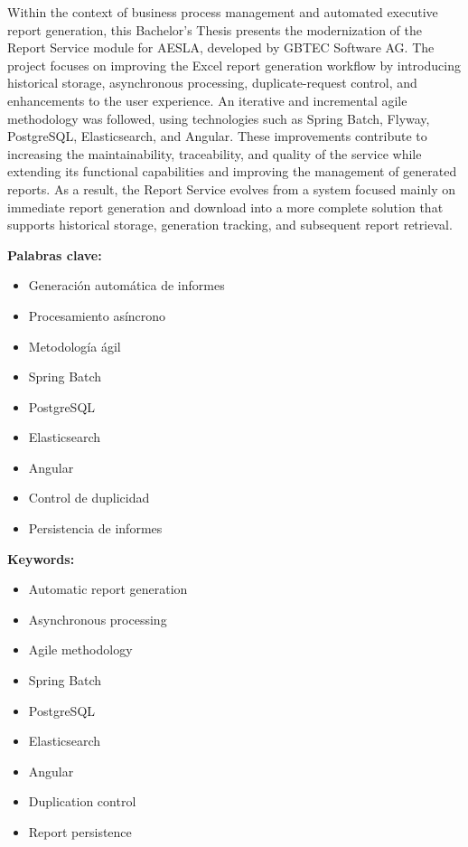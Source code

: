 \documentclass[11pt,a4paper,titlepage,oneside]{report}
\begin{document}
Within the context of business process management and automated executive
report generation, this Bachelor's Thesis presents the modernization of the
Report Service module for AESLA, developed by GBTEC Software AG. The project
focuses on improving the Excel report generation workflow by introducing
historical storage, asynchronous processing, duplicate-request control, and
enhancements to the user experience. An iterative and incremental agile
methodology was followed, using technologies such as Spring Batch, Flyway,
PostgreSQL, Elasticsearch, and Angular. These improvements contribute to
increasing the maintainability, traceability, and quality of the service while
extending its functional capabilities and improving the management of generated
reports. As a result, the Report Service evolves from a system focused mainly
on immediate report generation and download into a more complete solution that
supports historical storage, generation tracking, and subsequent report
retrieval.

\vspace{1cm}

\noindent
\begin{minipage}[t]{0.45\textwidth}
\textbf{Palabras clave:}
\begin{itemize}[leftmargin=*]
    \item Generación automática de informes
    \item Procesamiento asíncrono
    \item Metodología ágil
    \item Spring Batch
    \item PostgreSQL
    \item Elasticsearch
    \item Angular
    \item Control de duplicidad
    \item Persistencia de informes
\end{itemize}
\end{minipage}
\hfill
\begin{minipage}[t]{0.45\textwidth}
\textbf{Keywords:}
\begin{itemize}[leftmargin=*]
    \item Automatic report generation
    \item Asynchronous processing
    \item Agile methodology
    \item Spring Batch
    \item PostgreSQL
    \item Elasticsearch
    \item Angular
    \item Duplication control
    \item Report persistence
\end{itemize}
\end{minipage}
\end{document}
